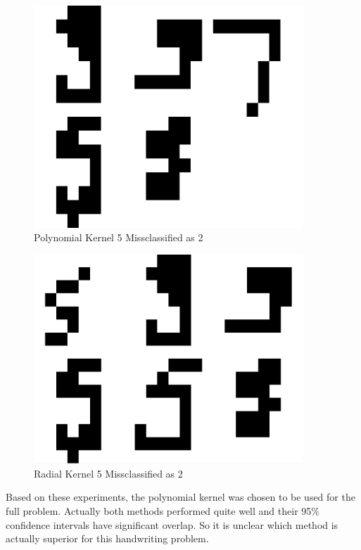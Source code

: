 \documentclass{article}
\begin{document}
\begin{figure}
\centering
\includegraphics[width=0.9\textwidth]{images/test2_5_correct5_class2_a0156.png}
\caption{Polynomial Kernel 5 Missclassified as 2}
\label{poly5errortest}
\end{figure}

\begin{figure}
\centering
\includegraphics[width=0.9\textwidth]{images/test2_5_correct5_class2_radial.png}
\caption{Radial Kernel 5 Missclassified as 2}
\label{radial5errortest}
\end{figure}

Based on these experiments, the polynomial kernel was chosen to be used for the full problem. Actually both methods performed quite well and their 95\% confidence intervals have significant overlap. So it is unclear which method is actually superior for this handwriting problem.
\end{document}
